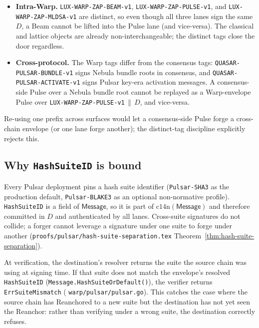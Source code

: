 \begin{itemize}[leftmargin=2em,nosep]
  \item \textbf{Intra-Warp.} \texttt{LUX-WARP-ZAP-BEAM-v1}, \texttt{LUX-WARP-ZAP-PULSE-v1}, and \texttt{LUX-WARP-ZAP-MLDSA-v1} are distinct, so even though all three lanes sign the same $D$, a Beam cannot be lifted into the Pulse lane (and vice-versa). The classical and lattice objects are already non-interchangeable; the distinct tags close the door regardless.
  \item \textbf{Cross-protocol.} The Warp tags differ from the consensus tags: \texttt{QUASAR-PULSAR-BUNDLE-v1} signs Nebula bundle roots in consensus, and \texttt{QUASAR-PULSAR-ACTIVATE-v1} signs Pulsar key-era activation messages. A consensus-side Pulse over a Nebula bundle root cannot be replayed as a Warp-envelope Pulse over \texttt{LUX-WARP-ZAP-PULSE-v1}$\,\|\,D$, and vice-versa.
\end{itemize}

Re-using one prefix across surfaces would let a consensus-side Pulse forge a cross-chain envelope (or one lane forge another); the distinct-tag discipline explicitly rejects this.

\subsection{Why \texttt{HashSuiteID} is bound}

Every Pulsar deployment pins a hash suite identifier (\texttt{Pulsar-SHA3} as the production default, \texttt{Pulsar-BLAKE3} as an optional non-normative profile). \texttt{HashSuiteID} is a field of $\mathsf{Message}$, so it is part of $\mathrm{c14n}(\mathsf{Message})$ and therefore committed in $D$ and authenticated by all lanes. Cross-suite signatures do not collide; a forger cannot leverage a signature under one suite to forge under another (\texttt{proofs/pulsar/hash-suite-separation.tex} Theorem~\ref{thm:hash-suite-separation}).

At verification, the destination's resolver returns the suite the source chain was using at signing time. If that suite does not match the envelope's resolved \texttt{HashSuiteID} (\texttt{Message.HashSuiteOrDefault()}), the verifier returns \texttt{ErrSuiteMismatch} (\cite{warpgo} \texttt{warp/pulsar/pulsar.go}). This catches the case where the source chain has Reanchored to a new suite but the destination has not yet seen the Reanchor: rather than verifying under a wrong suite, the destination correctly refuses.

